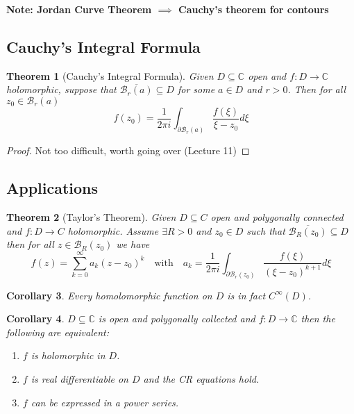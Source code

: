 \documentclass[11pt]{article}
\newcommand{\C}{\mathbb{C}}
\newenvironment{note}
	{\begin{mdframed}[backgroundcolor=white, linecolor=red, roundcorner=5pt, linewidth=1pt]\bfseries{Note:}\normalfont}
	{\end{mdframed}}
\newtheorem{theorem}{Theorem}[section]
\newtheorem{cor}[theorem]{Corollary}
\begin{document}
\begin{note}
Jordan Curve Theorem $\implies$ Cauchy's theorem for contours
\end{note}

\subsection{Cauchy's Integral Formula}
\begin{theorem}[Cauchy's Integral Formula]
Given $D\subseteq \C$ open and $f:D\to\C$ holomorphic, suppose that $\overline{\mathcal{B}_r(a)}\subseteq D$ for some $a\in D$ and $r>0$.
Then for all $z_0\in\mathcal{B}_r(a)$
\[
	f(z_0)=\frac{1}{2\pi i}\int_{\partial\mathcal{B}_r(a)}\frac{f(\xi)}{\xi-z_0}d\xi
\]
\end{theorem}

\begin{proof}
Not too difficult, worth going over (Lecture 11)
\end{proof}

\subsection{Applications}

\begin{theorem}[Taylor's Theorem]
Given $D\subseteq C$ open and polygonally connected and $f:D\to C$ holomorphic.
Assume $\exists R>0$ and $z_0\in D$ such that $\overline{\mathcal{B}_R(z_0)}\subseteq D$ then for all $z\in\mathcal{B}_R(z_0)$ we have
\[
	f(z)=\sum_{k=0}^{\infty}a_k(z-z_0)^k\quad\text{with}\quad a_k=\frac{1}{2\pi i}\int_{\partial \mathcal{B}_r(z_0)} \frac{f(\xi)}{(\xi - z_0)^{k+1}}d\xi
\]
\end{theorem}

\begin{cor}
	Every homolomorphic function on $D$ is in fact $C^\infty(D)$.
\end{cor}

\begin{cor}
$D\subseteq \C$ is open and polygonally collected and $f:D\to\C$ then the following are equivalent:
\begin{enumerate}[label=(\roman*)]
	\item $f$ is holomorphic in $D$.
	\item $f$ is real differentiable on $D$ and the CR equations hold.
	\item $f$ can be expressed in a power series.
\end{enumerate}
\end{cor}
\end{document}
